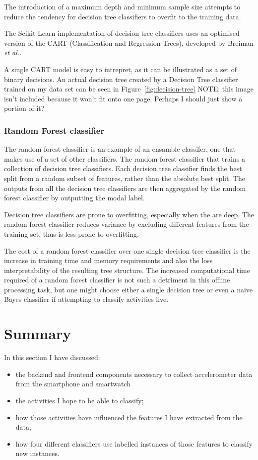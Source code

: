         The introduction of a maximum depth and minimum sample size attempts to reduce the tendency for decision tree classifiers to overfit to the training data.
      
        The Scikit-Learn implementation of decision tree classifiers uses an optimised version of the CART (Classification and Regression Trees), developed by Breiman \emph{et al.}\cite{breiman1984classification}.
        
        A single CART model is easy to intrepret, as it can be illustrated as a set of binary decisions. An actual decision tree created by a Decision Tree classifier trained on my data set can be seen in Figure~\ref{fig:decision-tree} NOTE: this image isn't included because it won't fit onto one page. Perhaps I should just show a portion of it? 
        
      \subsubsection{Random Forest classifier}
        The random forest classifier is an example of an ensamble classifer, one that makes use of a set of other classifiers. The random forest classifier that trains a collection of decision tree classifiers. Each decision tree classifier finds the best split from a random subset of features, rather than the absolute best split. The outputs from all the decision tree classifiers are then aggregated by the random forest classifier by outputting the modal label.
        
        Decision tree classifiers are prone to overfitting, especially when the are deep. The random forest classifier reduces variance by excluding different features from the training set, thus is less prone to overfitting.
        
        The cost of a random forest classifier over one single decision tree classifier is the increase in training time and memory requirements and also the loss interpretability of the resulting tree structure. The increased computational time required of a random forest classifier is not such a detriment in this offline processing task, but one might choose either a single decision tree or even a naive Bayes classifier if attempting to classify activities live.
  \section{Summary}
    In this section I have discussed:
    \begin{itemize}
      \item the backend and frontend components necessary to collect accelerometer data from the smartphone and smartwatch
      \item the activities I hope to be able to classify;
      \item how those activities have influenced the features I have extracted from the data;
      \item how four different classifiers use labelled instances of those features to classify new instances.
    \end{itemize}
